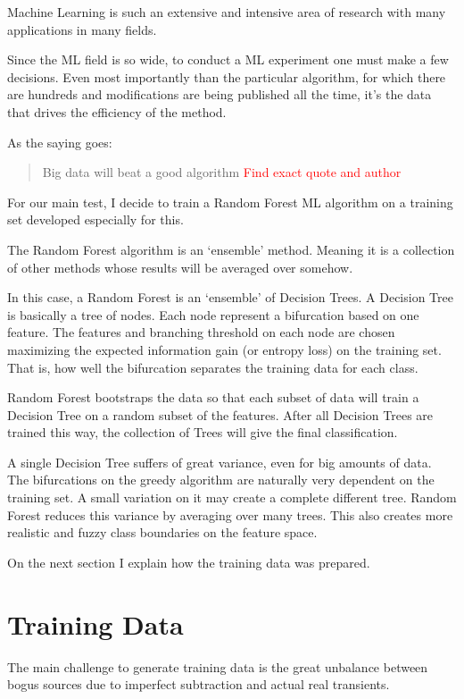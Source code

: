 Machine Learning is such an extensive and intensive area of research with many applications in many fields.

Since the ML field is so wide, to conduct a ML experiment one must make a few decisions. Even most importantly than the particular algorithm, 
for which there are hundreds and modifications are being published all the time, it's the data that drives the efficiency of the method.

As the saying goes:

\begin{quotation}
Big data will beat a good algorithm \textcolor{red}{Find exact quote and author}
\end{quotation}

For our main test, I decide to train a Random Forest ML algorithm on a training set developed especially for this.

The Random Forest algorithm is an `ensemble' method. Meaning it is a collection of other methods whose results will be averaged over somehow.

In this case, a Random Forest is an `ensemble' of Decision Trees. A Decision Tree is basically a tree of nodes. Each node represent a bifurcation based on one feature. The features and branching threshold on each node are chosen maximizing the expected information gain (or entropy loss) on the training set. That is, how well the bifurcation separates the training data for each class.

Random Forest bootstraps the data so that each subset of data will train a Decision Tree on a random subset of the features. After all Decision Trees are trained this way, the collection of Trees will give the final classification.

A single Decision Tree suffers of great variance, even for big amounts of data. The bifurcations on the greedy algorithm are naturally very dependent on the training set. A small variation on it may create a complete different tree. Random Forest reduces this variance by averaging over many trees. This also creates more realistic and fuzzy class boundaries on the feature space.

On the next section I explain how the training data was prepared.

\section{Training Data}

The main challenge to generate training data is the great unbalance between bogus sources due to imperfect subtraction and actual real transients.

